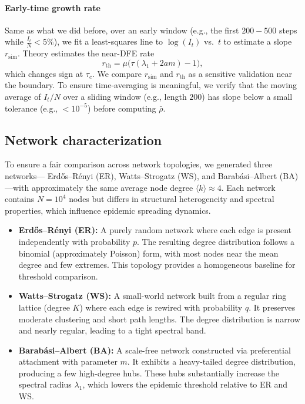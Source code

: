 \documentclass[pdflatex,sn-mathphys-num]{sn-jnl}%
\theoremstyle{thmstyleone}%
\theoremstyle{thmstyletwo}%
\theoremstyle{thmstylethree}%
\begin{document}
\paragraph*{Early-time growth rate}
Same as what we did before, over an early window (e.g., the first \(200\!-\!500\) steps while \(\frac{I_t}{N}<5\%\)), we fit a least-squares line to \(\log(I_t)\) vs.\ \(t\) to estimate a slope \(r_{\mathrm{sim}}\).
Theory estimates the near-DFE rate
\[
r_{\mathrm{th}}=\mu\big(\tau(\lambda_1+2am)-1\big),
\]
which changes sign at \(\tau_c\).
We compare \(r_{\mathrm{sim}}\) and \(r_{\mathrm{th}}\) as a sensitive validation near the boundary. To ensure time-averaging is meaningful, we verify that the moving average of \(I_t/N\) over a sliding window (e.g., length \(200\)) has slope below a small tolerance (e.g., \(<10^{-5}\)) before computing \(\bar\rho\).


\subsection{Network characterization}

To ensure a fair comparison across network topologies, we generated three networks—
Erd\H{o}s–R\'enyi (ER), Watts–Strogatz (WS), and Barab\'asi–Albert (BA)—with approximately the same
average node degree $\langle k \rangle \approx 4$.  
Each network contains $N=10^4$ nodes but differs in structural heterogeneity and spectral
properties, which influence epidemic spreading dynamics.

\begin{itemize}
  \item \textbf{Erd\H{o}s--R\'enyi (ER):} A purely random network where each edge is present
  independently with probability $p$.  
  The resulting degree distribution follows a binomial (approximately Poisson) form, with most nodes near the mean degree and few extremes.
  This topology provides a homogeneous baseline for threshold comparison.

  \item \textbf{Watts--Strogatz (WS):} A small-world network built from a regular ring lattice
  (degree $K$) where each edge is rewired with probability $q$.
  It preserves moderate clustering and short path lengths.
  The degree distribution is narrow and nearly regular, leading to a tight spectral band.

  \item \textbf{Barab\'asi--Albert (BA):} A scale-free network constructed via preferential
  attachment with parameter $m$.  
  It exhibits a heavy-tailed degree distribution, producing a few high-degree hubs.
  These hubs substantially increase the spectral radius $\lambda_1$,
  which lowers the epidemic threshold relative to ER and WS.
\end{itemize}
\end{document}
